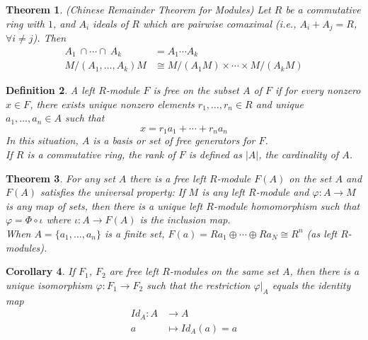 \documentclass[a4paper,8pt]{article}
\newcommand{\abs}[1]{\left\lvert#1\right\rvert}
\newcommand{\hlt}[1]{\textit{{\color{blue}#1}}}
\theoremstyle{theorem}
\newtheorem{theorem}{Theorem}[subsection]
\newtheorem{corollary}[theorem]{Corollary}
\newtheorem{definition}[theorem]{Definition}
\begin{document}
\begin{theorem}
\hlt{(Chinese Remainder Theorem for Modules)} Let $R$ be a commutative ring with $1$, and $A_i$ ideals of $R$ which are pairwise comaximal (i.e., $A_i + A_j = R$, $\forall i \neq j$). Then
\begin{align}
A_1 \ \cap \cdots \cap \ A_k &= A_1 \cdots A_k \nonumber \\
M/(A_1, \ldots, A_k)M &\cong M/(A_1 M) \times \cdots \times M/(A_k M) \nonumber
\end{align}
\end{theorem}

\begin{definition}
A left $R$-module $F$ is \hlt{free on the subset} $A$ of $F$ if for every nonzero $x \in F$, there exists unique nonzero elements $r_1, \ldots, r_n \in R$ and unique $a_1, \ldots, a_n \in A$ such that
\begin{equation}
x = r_1 a_1 + \cdots + r_n a_n \nonumber
\end{equation}
In this situation, $A$ is a \hlt{basis or set of free generators} for $F$.\\
If $R$ is a commutative ring, the \hlt{rank} of $F$ is defined as $\abs{A}$, the cardinality of $A$.
\end{definition}

\begin{theorem}
\label{thm:universalproperty}
For any set $A$ there is a free left $R$-module $F(A)$ on the set $A$ and $F(A)$ satisfies the universal property: If $M$ is any left $R$-module and $\varphi: A \rightarrow M$ is any map of sets, then there is a unique left $R$-module homomorphism such that $\varphi = \Phi \circ \iota$ where $\iota: A \rightarrow F(A)$ is the inclusion map.\\
When $A=\{a_1, \ldots, a_n\}$ is a finite set, $F(a)=Ra_1 \oplus \cdots \oplus Ra_N \cong R^n$ (as left $R$-modules).
\end{theorem}

\begin{corollary}
If $F_1$, $F_2$ are free left $R$-modules on the same set $A$, then there is a unique isomorphism $\varphi: F_1 \rightarrow F_2$ such that the restriction $\varphi|_{A}$ equals the identity map
\begin{align}
Id_{A}: A &\rightarrow A \nonumber \\
a &\mapsto Id_{A}(a) = a \nonumber
\end{align}
\end{corollary}
\end{document}
